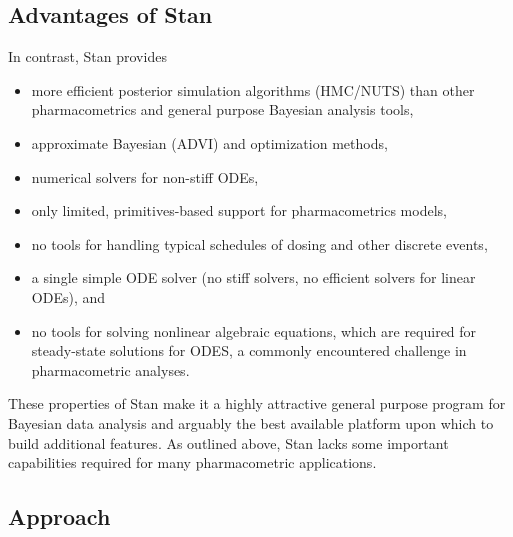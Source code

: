 \documentclass[11pt]{article}
\newcommand{\instructions}[1]{}
\begin{document}
\subsection*{Advantages of Stan}

In contrast, Stan provides

\begin{itemize}
\item more efficient posterior simulation algorithms (HMC/NUTS) than
  other pharmacometrics and general purpose Bayesian analysis tools,
\item approximate Bayesian (ADVI) and optimization methods,
\item numerical solvers for non-stiff ODEs,
\item only limited, primitives-based support for pharmacometrics models,
\item no tools for handling typical schedules of dosing and other discrete events,
\item a single simple ODE solver (no stiff solvers, no efficient
  solvers for linear ODEs), and
\item no tools for solving nonlinear algebraic equations, which are
  required for steady-state solutions for ODES, a commonly encountered
  challenge in pharmacometric analyses.
\end{itemize}

These properties of Stan make it a highly attractive general purpose
program for Bayesian data analysis and arguably the best available
platform upon which to build additional features. As outlined above,
Stan lacks some important capabilities required for many
pharmacometric applications.

\subsection*{Approach}

\instructions{ Instructions: Describe the overall strategy,
    methodology, and analyses to be used to accomplish the specific
    aims of the project. Unless addressed separately in Item 5.5.15,
    include how the data will be collected, analyzed, and interpreted
    as well as any resource sharing plans as appropriate.  Discuss
    potential problems, alternative strategies, and benchmarks for
    success anticipated to achieve the aims.  If the project is in the
    early stages of development, describe any strategy to establish
    feasibility, and address the management of any high risk aspects
    of the proposed work.}
\end{document}
